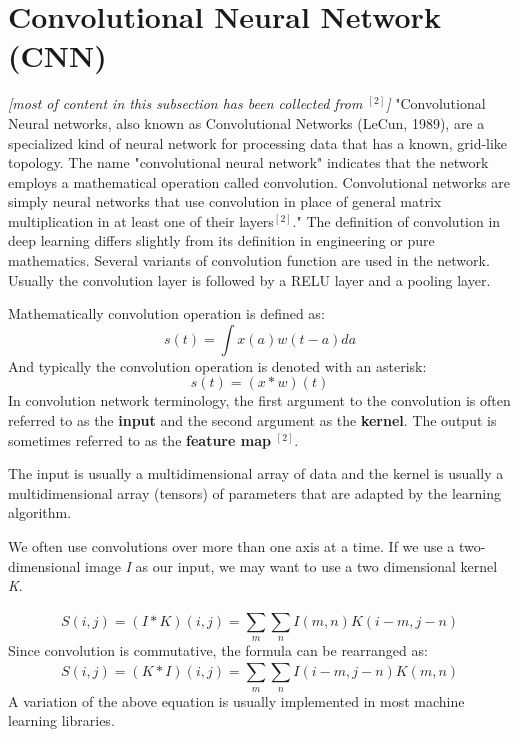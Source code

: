 \documentclass{article}
\begin{document}
\section*{Convolutional Neural Network (CNN)}
\textit{[most of content in this subsection has been collected from $^{[2]}$]}
\newline
\newline
"Convolutional Neural networks, also known as Convolutional Networks (LeCun, 1989), are a specialized kind of neural network for processing data that has a known, grid-like topology. The name "convolutional neural network" indicates that the network employs a mathematical operation called convolution. Convolutional networks are simply neural networks that use convolution in place of general matrix multiplication in at least one of their layers$^{[2]}$." The definition of convolution in deep learning differs slightly from its definition in engineering or pure mathematics. Several variants of convolution function are used in the network. Usually the convolution layer is followed by a RELU layer and a pooling layer.

Mathematically convolution operation is defined as:
$$s(t) = \int x(a)w(t-a)da$$
And typically the convolution operation is denoted with an asterisk:
$$s(t)=(x\ast w)(t)$$
In convolution network terminology, the first argument to the convolution is often referred to as the \textbf{input} and the second argument as the \textbf{kernel}. The output is sometimes referred to as the \textbf{feature map} $^{[2]}$.

The input is usually a multidimensional array of data and the kernel is usually a multidimensional array (tensors) of parameters that are adapted by the learning algorithm. 

We often use convolutions over more than one axis at a time. If we use a two-dimensional image \textit{I} as our input, we may want to use a two dimensional kernel \textit{K}. 

$$S(i,j) = (I \ast K)(i,j) = \sum_{m}^{} \sum_{n} I (m,n) K (i-m, j-n)$$
Since convolution is commutative, the formula can be rearranged as:
$$S(i,j) = (K \ast I)(i,j) = \sum_{m}^{} \sum_{n} I (i-m, j-n)K (m,n) $$
A variation of the above equation is usually implemented in most machine learning libraries.
\end{document}
